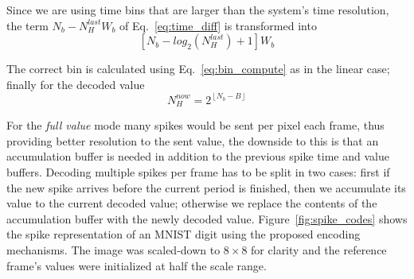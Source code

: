 \documentclass[conference]{IEEEtran}
\begin{document}
Since we are using time bins that are larger than the system's time resolution, the term $N_{b} - N_{H}^{last}W_{b}$ of Eq.~\ref{eq:time_diff} is transformed into
\begin{equation}
\left[N_{b} - log_{2}(N_{H}^{last})  + 1\right]W_{b}
\end{equation}

The correct bin is calculated using Eq.~\ref{eq:bin_compute} as in the linear case; finally for the decoded value
\begin{equation}
N_{H}^{now} = 2^{ \left\lfloor N_{b} - B \right\rfloor }
\label{eq:new_Nh_exp}
\end{equation}

For the \textit{full value} mode many spikes would be sent per pixel each frame, thus providing better resolution to the sent value, the downside to this is that an accumulation buffer is needed in addition to the previous spike time and value buffers. Decoding multiple spikes per frame has to be split in two cases: first if the new spike arrives before the current period is finished, then we accumulate its value to the current decoded value; otherwise we replace the contents of the accumulation buffer with the newly decoded value. Figure~\ref{fig:spike_codes} shows the spike representation of an MNIST digit using the proposed encoding mechanisms. The image was scaled-down to $8\times8$ for clarity and the reference frame's values were initialized at half the scale range.
\end{document}
